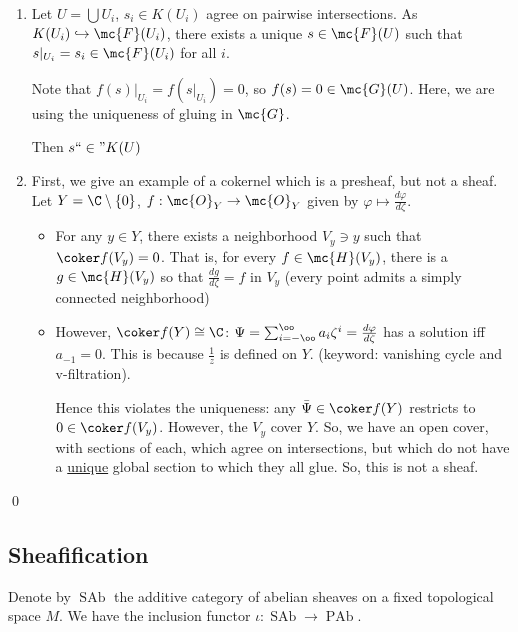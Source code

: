 \documentclass[x11names,reqno,14pt]{extarticle}
\newcommand{\fin}{``\in"}
\newcommand{\into}{\hookrightarrow}
\DeclareMathOperator{\SAb}{SAb}
\DeclareMathOperator{\PAb}{PAb}
\begin{document}
\begin{enumerate}[label=(\alph*)]

\item Let $U = \bigcup U_i$, $s_i \in K(U_i)$ agree on pairwise intersections. As $K(U_i) \into \mc{F}(U_i)$, there exists a unique $s \in \mc{F}(U)$ such that $s|_{U_i} = s_i \in \mc{F}(U_i)$ for all $i$.

Note that $f(s)|_{U_i} = f(s|_{U_i}) = 0$, so $f(s) = 0 \in \mc{G}(U)$. Here, we are using the uniqueness of gluing in $\mc{G}$.  

Then $s \fin K(U)$

\item First, we give an example of a cokernel which is a presheaf, but not a sheaf. Let $Y = \C\setminus\{0\}$, $f:\mc{O}_Y\to\mc{O}_Y$ given by $\varphi\mapsto\frac{d\varphi}{d\zeta}$. 

\begin{itemize}

\item For any $y \in Y$, there exists a neighborhood $V_y \ni y$ such that $\coker f(V_y) = 0$. That is, for every $f\in \mc{H}(V_y)$, there is a $g \in \mc{H}(V_y)$ so that $\frac{dg}{d\zeta} = f$ in $V_y$ (every point admits a simply connected neighborhood)

\item However, $\coker f(Y) \cong \C$: $\Psi = \sum_{i=-\oo}^\oo a_i\zeta^i = \frac{d\varphi}{d\zeta}$ has a solution iff $a_{-1} = 0$. This is because $\frac{1}{z}$ is defined on $Y$. (keyword: vanishing cycle and v-filtration). 

Hence this violates the uniqueness: any $\bar{\Psi} \in \coker f(Y)$ restricts to $0 \in \coker f(V_y)$. However, the $V_y$ cover $Y$. So, we have an open cover, with sections of each, which agree on intersections, but which do not have a \underline{unique} global section to which they all glue. So, this is not a sheaf.

\end{itemize}

\end{enumerate}

\qed

\subsection*{Sheafification}

Denote by $\SAb$ the additive category of abelian sheaves on a fixed topological space $M$. We have the inclusion functor $\iota:\SAb\to\PAb$. 
\end{document}
